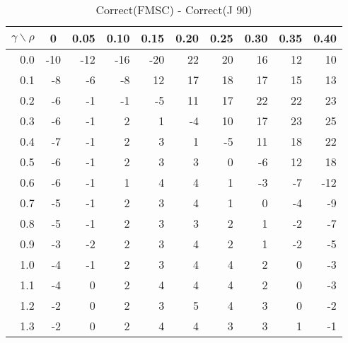 \documentclass[12pt]{article}
\begin{document}
%
\begin{table}[!tbp]
\caption{Correct(FMSC) - Correct(J 90)}
 \begin{center}
 \begin{tabular}{r|rrrrrrrrr}\hline\hline
\multicolumn{1}{c|}{$\gamma\backslash\rho$}&\multicolumn{1}{c}{0}&\multicolumn{1}{c}{0.05}&\multicolumn{1}{c}{0.10}&\multicolumn{1}{c}{0.15}&\multicolumn{1}{c}{0.20}&\multicolumn{1}{c}{0.25}&\multicolumn{1}{c}{0.30}&\multicolumn{1}{c}{0.35}&\multicolumn{1}{c}{0.40}\tabularnewline
\hline



0.0&-10&-12&-16&-20&22&20&16&12& 10\tabularnewline
0.1& -8& -6& -8& 12&17&18&17&15& 13\tabularnewline
0.2& -6& -1& -1& -5&11&17&22&22& 23\tabularnewline
0.3& -6& -1&  2&  1&-4&10&17&23& 25\tabularnewline
0.4& -7& -1&  2&  3& 1&-5&11&18& 22\tabularnewline
0.5& -6& -1&  2&  3& 3& 0&-6&12& 18\tabularnewline
0.6& -6& -1&  1&  4& 4& 1&-3&-7&-12\tabularnewline
0.7& -5& -1&  2&  3& 4& 1& 0&-4& -9\tabularnewline
0.8& -5& -1&  2&  3& 3& 2& 1&-2& -7\tabularnewline
0.9& -3& -2&  2&  3& 4& 2& 1&-2& -5\tabularnewline
1.0& -4& -1&  2&  3& 4& 4& 2& 0& -3\tabularnewline
1.1& -4&  0&  2&  4& 4& 4& 2& 0& -3\tabularnewline
1.2& -2&  0&  2&  3& 5& 4& 3& 0& -2\tabularnewline
1.3& -2&  0&  2&  4& 4& 3& 3& 1& -1\tabularnewline
\hline
\end{tabular}

\end{center}

\end{table}
\end{document}

